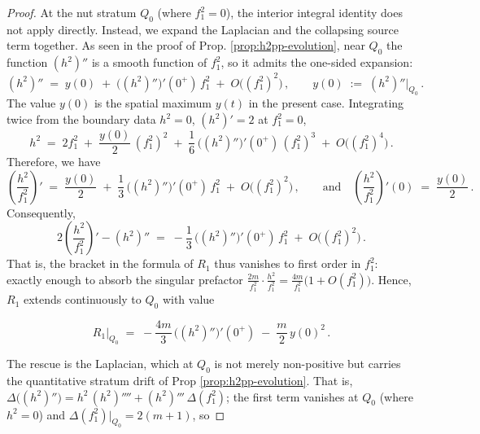 \documentclass[10pt,a4paper]{amsart}
\begin{document}
\begin{proof}
	At the nut stratum $Q_0$ (where $f_1^2 = 0$), the interior integral identity does not apply directly. Instead, we expand the Laplacian and the collapsing source term together. %
	As seen in the proof of Prop. \ref{prop:h2pp-evolution}, near $Q_0$ the function $( h^2 )''$ is a smooth function of $f_1^2$, so it admits the one-sided expansion:	
	\[
	( h^2 )'' \;=\; y (0) \;+\; \big( ( h^2 )'' \big)' ( 0^+ )\, f_1^2 \;+\; O \big( ( f_1^2 )^2 \big) \,, \qquad y (0) \;:=\; ( h^2 )'' \big|_{Q_0} \,.
	\]
	The value $y (0)$ is the spatial maximum $y (t)$ in the present case. Integrating twice from the boundary data $h^2 = 0$, $( h^2 )' = 2$ at $f_1^2 = 0$,
	\[
	h^2 \;=\; 2 f_1^2 \;+\; \frac{y (0)}{2}\, ( f_1^2 )^2 \;+\; \frac{1}{6}\, \big( ( h^2 )'' \big)' ( 0^+ )\, ( f_1^2 )^3 \;+\; O \big( ( f_1^2 )^4 \big) \,.
	\]
	Therefore, we have	
	\[
	\left( \frac{h^2}{f_1^2} \right)' \;=\; \frac{y (0)}{2} \;+\; \frac{1}{3}\, \big( ( h^2 )'' \big)' ( 0^+ )\, f_1^2 \;+\; O \big( ( f_1^2 )^2 \big) \,, \qquad \text{and} \quad \left( \frac{h^2}{f_1^2} \right)' (0) \;=\; \frac{y (0)}{2} \,.
	\]	
	Consequently,	
	\[
	2 \left( \frac{h^2}{f_1^2} \right)' - ( h^2 )'' \;=\; - \frac{1}{3}\, \big( ( h^2 )'' \big)' ( 0^+ )\, f_1^2 \;+\; O \big( ( f_1^2 )^2 \big) \,.
	\]
	That is, the bracket in the formula of $R_1$ thus vanishes to {first order} in $f_1^2$: exactly enough to absorb the singular prefactor $\tfrac{2 m}{f_1^2} \cdot \tfrac{h^2}{f_1^2} = \tfrac{4 m}{f_1^2} \big( 1 + O ( f_1^2 ) \big)$. Hence, $R_1$ extends continuously to $Q_0$ with value
	
	\[
	R_1 \big|_{Q_0} \;=\; - \frac{4 m}{3}\, \big( ( h^2 )'' \big)' ( 0^+ ) \;-\; \frac{m}{2}\, y (0)^2 \,.
	\]
	
	
	The rescue is the Laplacian, which at $Q_0$ is not merely non-positive but carries the quantitative stratum drift of Prop \ref{prop:h2pp-evolution}. That is, $\Delta \big( ( h^2 )'' \big) = h^2\, ( h^2 )'''' + ( h^2 )'''\, \Delta ( f_1^2 )$; the first term vanishes at $Q_0$ (where $h^2 = 0$) and $\Delta ( f_1^2 ) |_{Q_0} = 2 ( m + 1 )$, so
	

\end{proof}
\end{document}
